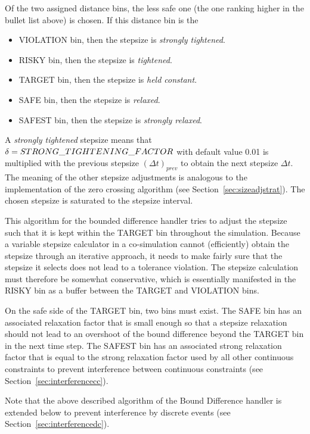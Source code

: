\noindent Of the two assigned distance bins, the less safe one (the one ranking higher in the bullet list above) is chosen. If this distance bin is the

\begin{itemize}
\item	VIOLATION bin, then the stepsize is \textit{strongly tightened}.
\item	RISKY bin, then the stepsize is \textit{tightened}.
\item TARGET bin, then the stepsize is \textit{held constant}.
\item	SAFE bin, then the stepsize is \textit{relaxed}.
\item SAFEST bin, then the stepsize is \textit{strongly relaxed}.
\end{itemize}

\noindent A \textit{strongly tightened} stepsize means that $\delta = STRONG\_\-TIGHTENING\_\-FACTOR$ with default value 0.01 is multiplied with the previous stepsize $(\Delta t)_{prev}$ to obtain the next stepsize $\Delta t$. The meaning of the other stepsize adjustments is analogous to the implementation of the zero crossing algorithm (see Section~\ref{sec:sizeadjstrat}). The chosen stepsize is saturated to the stepsize interval.

\noindent This algorithm for the bounded difference handler tries to adjust the stepsize such that it is kept within the TARGET bin throughout the simulation. Because a variable stepsize calculator in a co-simulation cannot (efficiently) obtain the stepsize through an iterative approach, it needs to make fairly sure that the stepsize it selects does not lead to a tolerance violation. The stepsize calculation must therefore be somewhat conservative, which is essentially manifested in the RISKY bin as a buffer between the TARGET and VIOLATION bins.

\noindent On the safe side of the TARGET bin, two bins must exist. The SAFE bin has an associated relaxation factor that is small enough so that a stepsize relaxation should not lead to an overshoot of the bound difference beyond the TARGET bin in the next time step. The SAFEST bin has an associated strong relaxation factor that is equal to the strong relaxation factor used by all other continuous constraints to prevent interference between continuous constraints (see Section~\ref{sec:interferencecc}).

\noindent Note that the above described algorithm of the Bound Difference handler is extended below to prevent interference by discrete events (see Section~\ref{sec:interferencedc}).

